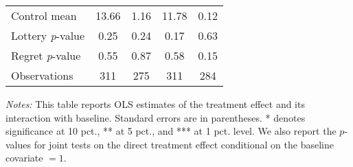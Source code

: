 \begin{table}[htbp]
{\begin{threeparttable}
\begin{tabular}{l*{4}{c}}
Control mean    &    13.66         &     1.16         &    11.78         &     0.12         \\
Lottery \emph{p}-value&     0.25         &     0.24         &     0.17         &     0.63         \\
Regret \emph{p}-value&     0.55         &     0.87         &     0.58         &     0.15         \\
Observations    &      311         &      275         &      311         &      284         \\
\bottomrule \end{tabular} \begin{tablenotes}[flushleft] \footnotesize \item \emph{Notes:} This table reports OLS estimates of the treatment effect and its interaction with baseline. Standard errors are in parentheses. * denotes significance at 10 pct., ** at 5 pct., and *** at 1 pct. level. We also report the \(p\)-values for joint tests on the direct treatment effect conditional on the baseline covariate $= 1$. \end{tablenotes} \end{threeparttable} } \end{table}

